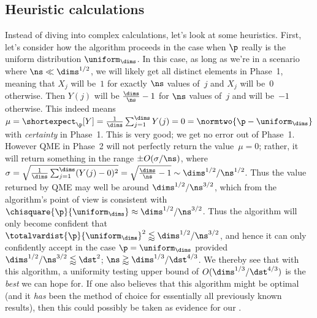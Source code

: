 \documentclass[11pt]{article}
\newcommand{\E}{\shortexpect}
\begin{document}
\subsection{Heuristic calculations}
Instead of diving into complex calculations, let's look at some heuristics.
First, let's consider how the algorithm proceeds in the case when $\p$ really is the uniform distribution $\uniform_\dims$.
In this case, as long as we're in a scenario where $\ns \ll \dims^{1/2}$, we will likely get all distinct elements in Phase~1, meaning that $X_j$ will be~$1$ for exactly $\ns$ values of~$j$ and $X_j$ will be~$0$ otherwise.
Then $Y(j)$ will be $\frac{\dims}{\ns}-1$ for $\ns$ values of~$j$ and will be~$-1$ otherwise.
This indeed means $\mu = \E_{\p}[Y] = \frac{1}{\dims} \sum_{j=1}^\dims Y(j) = 0 = \normtwo{\p - \uniform_\dims}$ with \emph{certainty} in Phase~1.  
This is very good; we get no error out of Phase~1.
However QME in Phase~2 will not perfectly return the value~$\mu =0$; rather, it will return something in the range $\pm O(\sigma/\ns)$, where $\sigma = \sqrt{\frac{1}{\dims}\sum_{j=1}^\dims (Y(j)-0)^2} = \sqrt{\frac{\dims}{\ns} - 1} \sim \dims^{1/2}/\ns^{1/2}$.
Thus the value returned by QME may well be around $\dims^{1/2}/\ns^{3/2}$, which from the algorithm's point of view is consistent with $\chisquare{\p}{\uniform_\dims} \approx \dims^{1/2}/\ns^{3/2}$.
Thus the algorithm will only become confident that $\totalvardist{\p}{\uniform_\dims}^2 \lessapprox \dims^{1/2}/\ns^{3/2}$, and hence it can only confidently accept in the case $\p = \uniform_\dims$ provided $\dims^{1/2}/\ns^{3/2} \lessapprox \dst^2$; \ie $\ns \gtrapprox \dims^{1/3}/\dst^{4/3}$.
We thereby see that with this algorithm, a uniformity testing upper bound of $O(\dims^{1/3}/\dst^{4/3})$ is the \emph{best} we can hope for.  
If one also believes that this algorithm might be optimal (and it \emph{has} been the method of choice for essentially all previously known results), then this could possibly be taken as evidence for our . 
\end{document}
